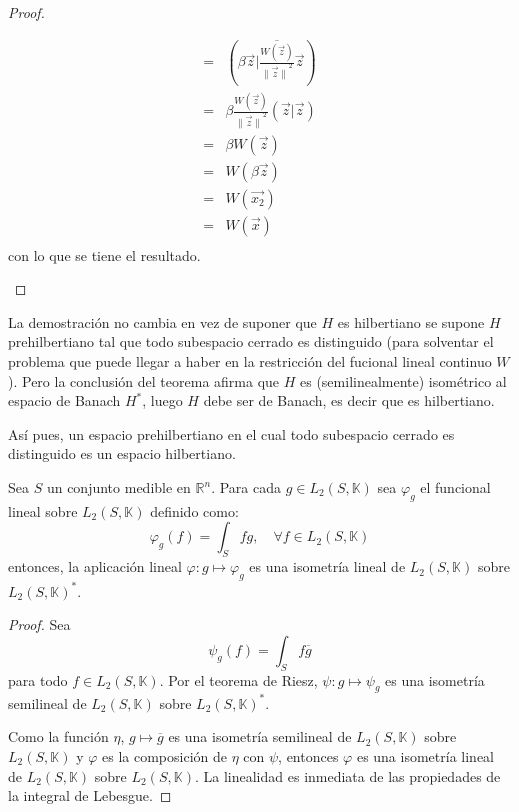 \documentclass[12pt]{report}
\newcounter{it}
\theoremstyle{largebreak}
\newcommand\norm[1]{\ensuremath{\|#1\|}}
\newcommand\pint[2]{\ensuremath{\left(#1\big| #2\right)}}
\newcommand\conj[1]{\ensuremath{\overline{#1}}}
\begin{document}
\begin{proof}
\begin{enumerate}
\begin{equation*}
\begin{split}
                    =&\pint{\beta\vec{z}}{\conj{\frac{W(\vec{z})}{\norm{\vec{z}}^2}}\vec{z}} \\
                    =&\beta\frac{W(\vec{z})}{\norm{\vec{z}}^2}\pint{\vec{z}}{\vec{z}} \\
                    =&\beta W(\vec{z}) \\
                    =&W(\beta\vec{z}) \\
                    =&W(\vec{x_2}) \\
                    =&W(\vec{x}) \\
                \end{split}
            \end{equation*}
            con lo que se tiene el resultado.

        \end{enumerate}
    \end{proof}

    \begin{obs}
        La demostración no cambia en vez de suponer que $H$ es hilbertiano se supone $H$ prehilbertiano tal que todo subespacio cerrado es distinguido (para solventar el problema que puede llegar a haber en la restricción del fucional lineal continuo $W$). Pero la conclusión del teorema afirma que $H$ es (semilinealmente) isométrico al espacio de Banach $H^*$, luego $H$ debe ser de Banach, es decir que es hilbertiano.

        Así pues, un espacio prehilbertiano en el cual todo subespacio cerrado es distinguido es un espacio hilbertiano. 
    \end{obs}

    \begin{propo}[Autodualidad de $L_2$]
        Sea $S$ un conjunto medible en $\mathbb{R}^n$. Para cada $g\in L_2(S,\mathbb{K})$ sea $\varphi_g$ el funcional lineal sobre $L_2(S,\mathbb{K})$ definido como:
        \begin{equation*}
            \varphi_g(f)=\int_Sfg, \quad\forall f\in L_2(S,\mathbb{K})
        \end{equation*}
        entonces, la aplicación lineal $\varphi:g\mapsto \varphi_g$ es una isometría lineal de $L_2(S,\mathbb{K})$ sobre $L_2(S,\mathbb{K})^*$.
    \end{propo}

    \begin{proof}
        Sea $$\psi_g(f)=\int_S f\conj{g}$$ para todo $f\in L_2(S,\mathbb{K})$. Por el teorema de Riesz, $\psi:g\mapsto\psi_g$ es una isometría semilineal de $L_2(S,\mathbb{K})$ sobre $L_2(S,\mathbb{K})^*$.

        Como la función $\eta$, $g\mapsto\conj{g}$ es una isometría semilineal de $L_2(S,\mathbb{K})$ sobre $L_2(S,\mathbb{K})$ y $\varphi$ es la composición de $\eta$ con $\psi$, entonces $\varphi$ es una isometría lineal de $L_2(S,\mathbb{K})$ sobre $L_2(S,\mathbb{K})$. La linealidad es inmediata de las propiedades de la integral de Lebesgue.

    \end{proof}
\end{document}
